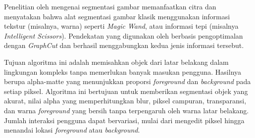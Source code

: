 

Penelitian oleh \cite{Rother:2004} mengenai segmentasi gambar memanfaatkan citra 
dan menyatakan bahwa alat segmentasi gambar klasik menggunakan informasi tekstur 
(misalnya, warna) seperti \emph{Magic Wand}, atau informasi tepi (misalnya 
\emph{Intelligent Scissors}). Pendekatan yang digunakan oleh \cite{Rother:2004} 
berbasis pengoptimalan dengan \emph{GraphCut} dan berhasil menggabungkan kedua jenis 
informasi tersebut.

Tujuan algoritma ini adalah memisahkan objek dari latar belakang dalam lingkungan 
kompleks tanpa memerlukan banyak masukan pengguna. Hasilnya berupa alpha-matte yang 
menunjukkan proporsi \emph{foreground} dan \emph{background} pada setiap piksel. Algoritma ini 
bertujuan untuk memberikan segmentasi objek yang akurat, nilai alpha yang memperhitungkan 
blur, piksel campuran, transparansi, dan warna \emph{foreground} yang bersih tanpa 
terpengaruh oleh warna latar belakang. Jumlah interaksi pengguna dapat bervariasi, 
mulai dari mengedit piksel hingga menandai lokasi \emph{foreground} atau \emph{background}.

